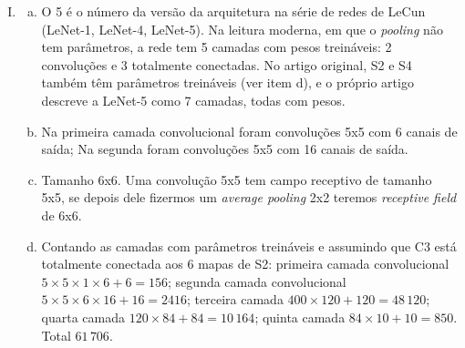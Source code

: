 \documentclass{dlproblemset}
\begin{document}
\begin{enumerate}[I)]
\item
\begin{enumerate}[a.]
    \item O 5 é o número da versão da arquitetura na série de redes de LeCun (LeNet-1, LeNet-4, LeNet-5). Na leitura moderna, em que o \textit{pooling} não tem parâmetros, a rede tem 5 camadas com pesos treináveis: 2 convoluções e 3 totalmente conectadas. No artigo original, S2 e S4 também têm parâmetros treináveis (ver item d), e o próprio artigo descreve a LeNet-5 como 7 camadas, todas com pesos.

    \item Na primeira camada convolucional foram convoluções 5x5 com 6 canais de saída; Na segunda foram convoluções 5x5 com 16 canais de saída.

    \item Tamanho 6x6. Uma convolução 5x5 tem campo receptivo de tamanho 5x5, se depois dele fizermos um \textit{average pooling} 2x2 teremos \textit{receptive field} de 6x6.


    \item Contando as camadas com parâmetros treináveis e assumindo que C3 está totalmente conectada aos 6 mapas de S2: primeira camada convolucional $5\times5\times1\times6 + 6 = 156$; segunda camada convolucional $5\times5\times6\times16 + 16 = 2416$; terceira camada $400\times120 + 120 = 48\,120$; quarta camada $120\times84 + 84 = 10\,164$; quinta camada $84\times10 + 10 = 850$. Total $61\,706$.


\end{enumerate}
\end{enumerate}
\end{document}
